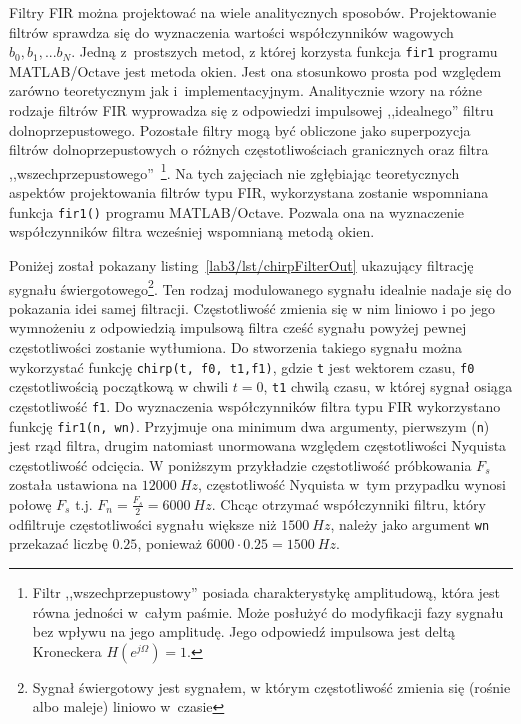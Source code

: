 Filtry FIR można projektować na wiele analitycznych sposobów. Projektowanie filtrów sprawdza się do wyznaczenia wartości współczynników wagowych $b_0, b_1, ... b_N$. Jedną z~prostszych metod, z której korzysta funkcja \texttt{fir1} programu MATLAB/Octave jest metoda okien. Jest ona stosunkowo prosta pod względem zarówno teoretycznym jak i~implementacyjnym. Analitycznie wzory na różne rodzaje filtrów FIR wyprowadza się z odpowiedzi impulsowej ,,idealnego'' filtru dolnoprzepustowego. Pozostałe filtry mogą być obliczone jako superpozycja filtrów dolnoprzepustowych o różnych częstotliwościach granicznych oraz filtra ,,wszechprzepustowego''~\footnote{Filtr ,,wszechprzepustowy'' posiada charakterystykę amplitudową, która jest równa jedności w~całym paśmie. Może posłużyć do modyfikacji fazy sygnału bez wpływu na jego amplitudę. Jego odpowiedź impulsowa jest deltą Kroneckera $H(e^{j\Omega}) = 1$.}. Na tych zajęciach nie zgłębiając teoretycznych aspektów projektowania filtrów typu FIR, wykorzystana zostanie wspomniana funkcja \texttt{fir1()} programu MATLAB/Octave. Pozwala ona na wyznaczenie współczynników filtra wcześniej wspomnianą metodą okien. 


Poniżej został pokazany listing~\ref{lab3/lst/chirpFilterOut} ukazujący filtrację sygnału świergotowego\footnote{Sygnał świergotowy jest sygnałem, w którym częstotliwość zmienia się (rośnie albo maleje) liniowo w~czasie}. Ten rodzaj modulowanego sygnału idealnie nadaje się do pokazania idei samej filtracji. Częstotliwość zmienia się w nim liniowo i po jego wymnożeniu z odpowiedzią impulsową filtra cześć sygnału powyżej pewnej częstotliwości zostanie wytłumiona. Do stworzenia takiego sygnału można wykorzystać funkcję \texttt{chirp(t, f0, t1,f1)}, gdzie \texttt{t} jest wektorem czasu, \texttt{f0} częstotliwością początkową w chwili $t=0$, \texttt{t1} chwilą czasu, w której sygnał osiąga częstotliwość \texttt{f1}. Do wyznaczenia współczynników filtra typu FIR wykorzystano funkcję \texttt{fir1(n, wn)}. Przyjmuje ona minimum dwa argumenty, pierwszym (\texttt{n}) jest rząd filtra, drugim natomiast unormowana względem częstotliwości Nyquista częstotliwość odcięcia. W poniższym przykładzie częstotliwość próbkowania $F_s$ została ustawiona na $12000~Hz$, częstotliwość Nyquista w~tym przypadku wynosi połowę $F_s$ t.j. $F_n=\frac{F_s}{2} = 6000~Hz$. Chcąc otrzymać współczynniki filtru, który odfiltruje częstotliwości sygnału większe niż $1500~Hz$, należy jako argument \texttt{wn} przekazać liczbę $0.25$, ponieważ $6000\cdot0.25 = 1500~Hz$.


